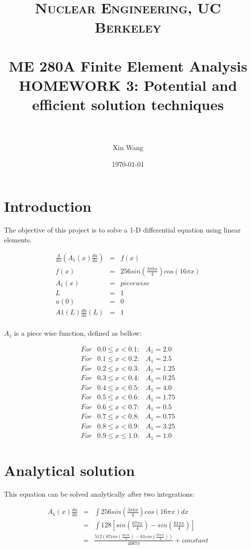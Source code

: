 \documentclass[paper=a4, fontsize=11pt]{article} %
\title{	
\normalfont \normalsize 
\textsc{Nuclear Engineering, UC Berkeley} \\ [25pt] %
\horrule{0.5pt} \\[0.4cm] %
\huge ME 280A Finite Element Analysis \\HOMEWORK 3: Potential and efficient solution techniques  \\  %
\horrule{2pt} \\[0.5cm] %
}
\author{Xin Wang} %
\date{\normalsize\today} %
\begin{document}
\maketitle %

\newpage
\section{Introduction}
The objective of this project is to solve a 1-D differential equation using linear elements.  

\begin{eqnarray}
\frac{d}{dx}(A_1(x) \frac{du}{dx}) &=& f(x)\nonumber\\
f(x)&=&256sin(\frac{3\pi kx}{4})cos(16 \pi x) \nonumber\\
A_1(x)& = & piecewise\nonumber\\
L&=&1 \nonumber\\
u(0)& =& 0 \nonumber\\
A1(L)\frac{du}{dx}(L) &=& 1 \nonumber\\
\end{eqnarray}

$A_1$ is a piece wise function, defined as bellow:

\begin{eqnarray}
For & 0.0 \leq x < 0.1 :& A_1 = 2.0 \nonumber\\
For & 0.1 \leq x < 0.2 :& A_1 = 2.5 \nonumber\\
For & 0.2 \leq x < 0.3 :& A_1 = 1.25 \nonumber\\
For & 0.3 \leq x < 0.4 :& A_1 = 0.25 \nonumber\\
For & 0.4 \leq x < 0.5 :& A_1 = 4.0 \nonumber\\
For & 0.5 \leq x < 0.6 :& A_1 = 1.75 \nonumber\\
For & 0.6 \leq x < 0.7 :& A_1 = 0.5 \nonumber\\
For & 0.7 \leq x < 0.8 :& A_1 = 0.75 \nonumber\\
For & 0.8 \leq x < 0.9 :& A_1 = 3.25\nonumber\\
For & 0.9 \leq x \leq 1.0 :& A_1 = 1.0
\end{eqnarray}

\section{Analytical solution}

This equation can be solved analytically after two integrations:

\begin{eqnarray}
\label{du_ana}
A_1(x)\frac{du}{dx}&=& \int 256sin(\frac{3\pi kx}{4})cos(16 \pi x) dx\nonumber\\
&=& \int 128[sin(\frac{67 \pi x}{4}) - sin(\frac{61 \pi x}{4})]\nonumber\\
&=& \frac{512(67cos(\frac{61\pi x}{4})- 61cos(\frac{67\pi x}{4}))}{4087\pi} +constant 
\end{eqnarray}
\end{document}
